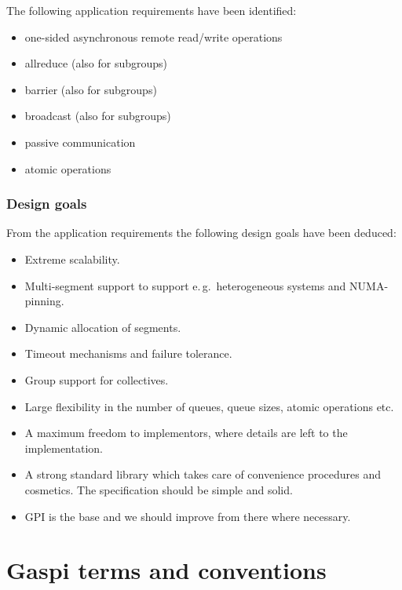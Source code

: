 \documentclass[a4paper]{article}
\newlength{\st}\setlength{\st}{0pt}
\newcommand{\GASPI}{{\sc Gaspi}}
\newcommand{\eg}{e.\,g.\ }
\begin{document}
The following application requirements have been identified:

\begin{itemize}
\item one-sided asynchronous remote read/write operations
\item allreduce (also for subgroups)
\item barrier (also for subgroups)
\item broadcast (also for subgroups)
\item passive communication
\item atomic operations
\end{itemize}


\subsubsection{Design goals}

From the application requirements the following design goals have been deduced:

\begin{itemize}
\item Extreme scalability.
\item Multi-segment support to support \eg heterogeneous systems and NUMA-pinning.
\item Dynamic allocation of segments.
\item Timeout mechanisms and failure tolerance.
\item Group support for collectives.
\item Large flexibility in the number of queues, queue sizes, atomic
  operations etc.
\item A maximum freedom to implementors, where details are left to the
  implementation.
\item A strong standard library which takes care of convenience
  procedures and cosmetics. The specification should be simple and solid.
\item GPI is the base and we should improve from there where necessary.
\end{itemize}


\section{\GASPI{} terms and conventions}
\end{document}
